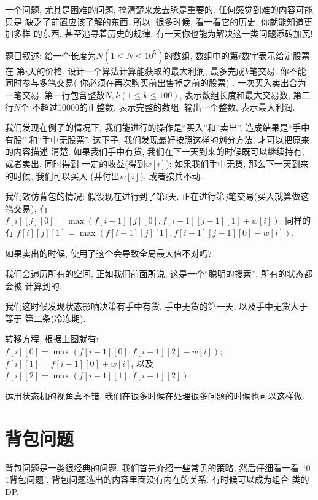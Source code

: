 \begin{remark}
    一个问题, 尤其是困难的问题, 搞清楚来龙去脉是重要的. 任何感觉到难的内容可能只是
    缺乏了前置应该了解的东西. 所以, 很多时候, 看一看它的历史, 你就能知道更加多样
    的东西. 甚至追寻着历史的规律, 有一天你也能为解决这一类问题添砖加瓦! 
\end{remark}

 题目叙述: 给一个长度为$N(1\leq N \leq 10^5)$的数组, 数组中的第$i$数字表示给定股票在
第$i$天的价格. 设计一个算法计算能获取的最大利润, 最多完成$k$笔交易. 你不能同时参与多笔交易( 你必须在再次购买前出售掉之前的股票) .
一次买入卖出合为一笔交易. 第一行包含整数$N,k(1\leq k\leq 100)$, 表示数组长度和最大交易数, 第二行$N$个
不超过10000的正整数, 表示完整的数组. 输出一个整数, 表示最大利润. 

我们发现在例子的情况下, 我们能进行的操作是``买入''和``卖出''. 造成结果是``手中有股''
和``手中无股票''. 这下子, 我们发现最好按照这样的划分方法, 才可以把原来的内容描述
清楚. 如果我们手中有货, 我们在下一天到来的时候既可以继续持有, 或者卖出, 同时得到
一定的收益(得到$w[i]$); 
如果我们手中无货, 那么下一天到来的时候, 我们可以买入 (并付出$w[i]$), 
或者按兵不动. 

我们效仿背包的情况: 假设现在进行到了第$i$天, 正在进行第$j$笔交易(买入就算做这笔交易), 有
$f[i][j][0]=\max(f[i-1][j][0], f[i-1][j-1][1]+w[i])$. 同样的有 
$f[i][j][1]=\max(f[i-1][j][1], f[i-1][j-1][0]-w[i])$. 

\begin{ques}
    如果卖出的时候, 使用了这个会导致全局最大值不对吗? 
\end{ques}

我们会遍历所有的空间, 正如我们前面所说, 这是一个``聪明的搜索'', 所有的状态都会被
计算到的. 

我们这时候发现状态影响决策有手中有货, 手中无货的第一天, 以及手中无货大于等于
第二条(冷冻期). 


转移方程, 根据上图就有: $f[i][0] = \max(f[i-1][0], f[i-1][2]-w[i])$; 
$f[i][1]=f[i-1][0]+w[i]$, 以及$f[i][2]=\max(f[i-1][1],f[i-1][2])$. 

运用状态机的视角真不错. 我们在很多时候在处理很多问题的时候也可以这样做. 

\section{背包问题} 

背包问题是一类很经典的问题. 我们首先介绍一些常见的策略, 然后仔细看一看
``0-1背包问题''. 背包问题选出的内容里面没有内在的关系. 有时候可以成为组合
类的DP. 

